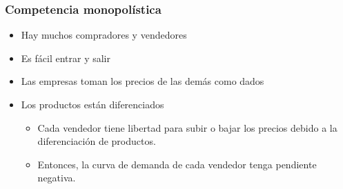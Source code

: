 \documentclass{beamer}
\begin{document}
\begin{frame}
\frametitle{Competencia monopolística}
\begin{itemize}
    \item Hay muchos compradores y vendedores\vspace{2mm}
    \item Es fácil entrar y salir\vspace{2mm}
    \item Las empresas toman los precios de las demás como dados\vspace{2mm}
    \item Los productos están diferenciados\vspace{2mm}
    \begin{itemize}
        \item Cada vendedor tiene libertad para subir o bajar los precios debido a la diferenciación de productos.\vspace{1mm}
        \item Entonces, la curva de demanda de cada vendedor tenga pendiente negativa.
    \end{itemize}
    \end{itemize}
\end{frame}
\end{document}
